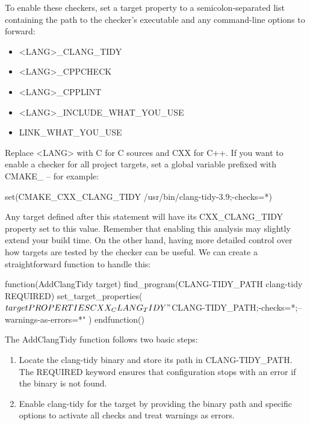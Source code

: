 To enable these checkers, set a target property to a semicolon-separated list containing the path to the checker’s executable and any command-line options to forward:

\begin{itemize}
\item
<LANG>\_CLANG\_TIDY

\item
<LANG>\_CPPCHECK

\item
<LANG>\_CPPLINT

\item
<LANG>\_INCLUDE\_WHAT\_YOU\_USE

\item
LINK\_WHAT\_YOU\_USE
\end{itemize}

Replace <LANG> with C for C sources and CXX for C++. If you want to enable a checker for all project targets, set a global variable prefixed with CMAKE\_ – for example:

\begin{shell}
set(CMAKE_CXX_CLANG_TIDY /usr/bin/clang-tidy-3.9;-checks=*)
\end{shell}

Any target defined after this statement will have its CXX\_CLANG\_TIDY property set to this value. Remember that enabling this analysis may slightly extend your build time. On the other hand, having more detailed control over how targets are tested by the checker can be useful. We can create a straightforward function to handle this:


\begin{cmake}
function(AddClangTidy target)
    find_program(CLANG-TIDY_PATH clang-tidy REQUIRED)
    set_target_properties(${target}
        PROPERTIES CXX_CLANG_TIDY
        "${CLANG-TIDY_PATH};-checks=*;--warnings-as-errors=*"
    )
endfunction()
\end{cmake}

The AddClangTidy function follows two basic steps:

\begin{enumerate}
\item
Locate the clang-tidy binary and store its path in CLANG-TIDY\_PATH. The REQUIRED keyword ensures that configuration stops with an error if the binary is not found.

\item
Enable clang-tidy for the target by providing the binary path and specific options to activate all checks and treat warnings as errors.
\end{enumerate}

